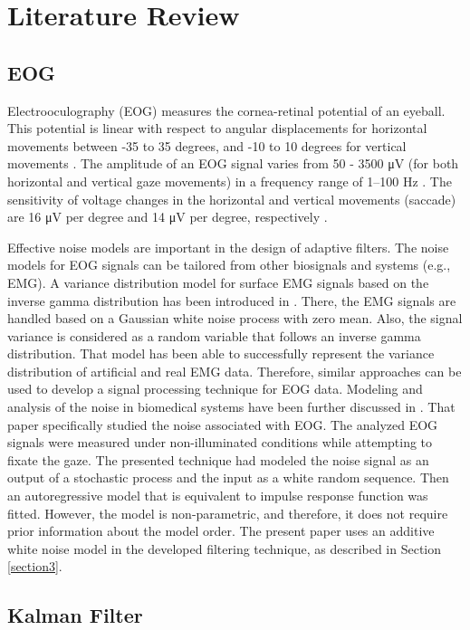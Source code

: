 \documentclass[transmag]{IEEEtran}
\begin{document}
\section{Literature Review}
\label{section2}

\subsection{EOG}
Electrooculography (EOG) measures the cornea-retinal potential of an eyeball.  This potential is linear with respect to angular displacements for horizontal movements between -35 to 35 degrees, and -10 to 10 degrees for vertical movements \cite{ref11}. The amplitude of an EOG signal varies from 50 - 3500 \si{\micro\volt} (for both horizontal and vertical gaze movements) in a frequency range of 1–100 \si{\hertz} \cite{ref12}. The sensitivity of voltage changes in the horizontal and vertical movements (saccade) are 16 \si{\micro\volt} per degree and 14 \si{\micro\volt} per degree, respectively \cite{ref12}.

Effective noise models \cite{ref24} are important in the design of adaptive filters. The noise models for EOG signals can be tailored from other biosignals and systems (e.g., EMG). A variance distribution model for surface EMG signals based on the inverse gamma distribution has been introduced in \cite{ref13}. There, the EMG signals are handled based on a Gaussian white noise process with zero mean. Also, the signal variance is considered as a random variable that follows an inverse gamma distribution. That model has been able to successfully represent the variance distribution of artificial and real EMG data. Therefore, similar approaches can be used to develop a signal processing technique for EOG data. Modeling and analysis of the noise in biomedical systems have been further discussed in \cite{ref14}. That paper specifically studied the noise associated with EOG. The analyzed EOG signals were measured under non-illuminated conditions while attempting to fixate the gaze. The presented technique had modeled the noise signal as an output of a stochastic process and the input as a white random sequence. Then an autoregressive model that is equivalent to impulse response function was fitted. However, the model is non-parametric, and therefore, it does not require prior information about the model order. The present paper uses an additive white noise model in the developed filtering technique, as described in Section \ref{section3}. 

\subsection{Kalman Filter}
\end{document}
